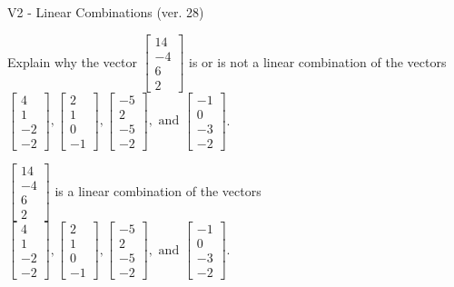 \begin{exercise}
  \begin{exerciseTitle}V2 - Linear Combinations (ver. 28)\end{exerciseTitle}
  \begin{exerciseStatement}
    Explain why the vector \(\left[\begin{array}{c}
14 \\
-4 \\
6 \\
2
\end{array}\right]\)  is or is not a linear 
	combination of the vectors \(\left[\begin{array}{c}
4 \\
1 \\
-2 \\
-2
\end{array}\right] , \left[\begin{array}{c}
2 \\
1 \\
0 \\
-1
\end{array}\right] , \left[\begin{array}{c}
-5 \\
2 \\
-5 \\
-2
\end{array}\right] , \text{ and } \left[\begin{array}{c}
-1 \\
0 \\
-3 \\
-2
\end{array}\right]\).
	


  \end{exerciseStatement}
  \begin{exerciseAnswer}
   \(\left[\begin{array}{c}
14 \\
-4 \\
6 \\
2
\end{array}\right]\) 
  	 is  
	a linear combination of the vectors \(\left[\begin{array}{c}
4 \\
1 \\
-2 \\
-2
\end{array}\right] , \left[\begin{array}{c}
2 \\
1 \\
0 \\
-1
\end{array}\right] , \left[\begin{array}{c}
-5 \\
2 \\
-5 \\
-2
\end{array}\right] , \text{ and } \left[\begin{array}{c}
-1 \\
0 \\
-3 \\
-2
\end{array}\right]\).


\end{exerciseAnswer}
\end{exercise}
